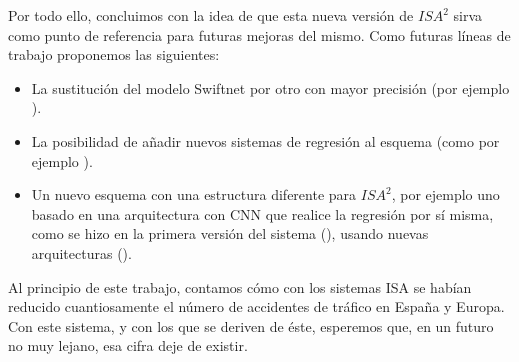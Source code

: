 
Por todo ello, concluimos con la idea de que esta nueva versión de $ISA^{2}$ sirva como punto de referencia para futuras mejoras del mismo. Como futuras líneas de trabajo proponemos las siguientes:

\begin{itemize}
\item La sustitución del modelo Swiftnet por otro con mayor precisión (por ejemplo \cite{hierarchical-multiscale}).
\item La posibilidad de añadir nuevos sistemas de regresión al esquema (como por ejemplo \cite{ridge}).
\item Un nuevo esquema con una estructura diferente para $ISA^{2}$, por ejemplo uno basado en una arquitectura con \ac{CNN} que realice la regresión por sí misma, como se hizo en la primera versión del sistema (\cite{isa2}), usando nuevas arquitecturas (\cite{cnn-ss}).
\end{itemize}

Al principio de este trabajo, contamos cómo con los sistemas \ac{ISA} se habían reducido cuantiosamente el número de accidentes de tráfico en España y Europa. Con este sistema, y con los que se deriven de éste, esperemos que, en un futuro no muy lejano, esa cifra deje de existir.
